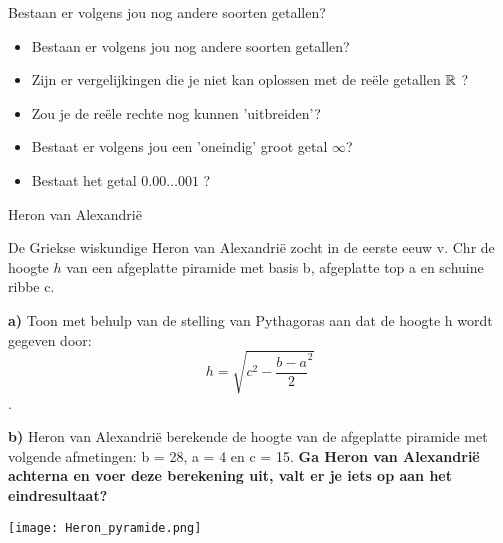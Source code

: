 \documentclass{ximera}
\begin{document}
\begin{denkvraag*}{} 
    
    Bestaan er volgens jou nog andere soorten getallen? 
\begin{itemize}
    \item Bestaan er volgens jou nog andere soorten getallen? 
    \item Zijn er vergelijkingen die je niet kan oplossen met de reële getallen \( \mathbb{R} \) ?
    \item Zou je de reële rechte nog kunnen 'uitbreiden'? 
    \item Bestaat er volgens jou een 'oneindig' groot getal \( \infty \)? 
    \item Bestaat het getal \(0.00\dots001 \) ? 
    
\end{itemize}
\end{denkvraag*}


\begin{exercise}{Heron van Alexandrië}

    De Griekse wiskundige Heron van Alexandrië zocht in de eerste eeuw v. Chr de hoogte \(h\) van een afgeplatte piramide met basis b, afgeplatte top a en schuine ribbe c. 

    \textbf{a)} 
    Toon met behulp van de stelling van Pythagoras aan dat de hoogte h wordt gegeven door: \[h = \sqrt{c^2 - {\frac{b-a}{2}}^2}\]. 

    \textbf{b)} 
    Heron van Alexandrië berekende de hoogte van de afgeplatte piramide met volgende afmetingen: b = 28, a = 4 en c = 15. 
    \textbf{Ga Heron van Alexandrië achterna en voer deze berekening uit, valt er je iets op aan het eindresultaat? }

    \begin{image}[0.4\textwidth]
        \texttt{[image: Heron\_pyramide.png]}   
    \end{image}


\end{exercise}
\end{document}

